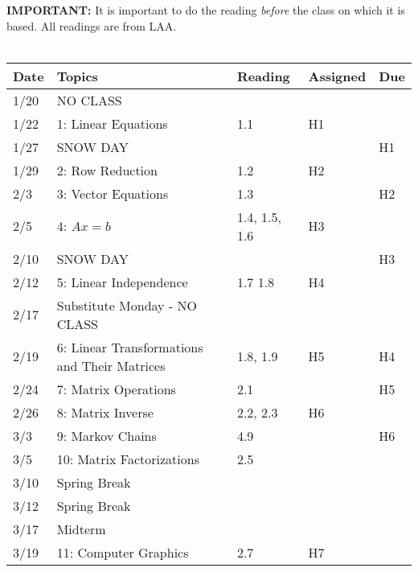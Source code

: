 \documentclass[11pt]{article}
\begin{document}
\textbf{IMPORTANT:} It is important to do the reading \emph{before} the class on
which it is based.   All readings are from LAA.
\\~\\
\small
\begin{centering}
\begin{tabular}{||l|p{3in}|l|l|l||}
\hline\hline
Date & Topics  & Reading & Assigned & Due  \\
\hline\hline
1/20 & NO CLASS &&& \\
1/22 & 1: Linear Equations & 1.1 & H1  & \\
\hline

1/27 & SNOW DAY &  & & H1 \\
1/29 & 2: Row Reduction & 1.2  & H2 & \\
\hline

2/3 & 3: Vector Equations & 1.3 & & H2 \\
2/5 & 4: $Ax = b$  & 1.4, 1.5, 1.6 & H3 & \\
\hline

2/10 & SNOW DAY & & & H3 \\
2/12 & 5: Linear Independence & 1.7 1.8 & H4 & \\ %
\hline

2/17 & Substitute Monday - NO CLASS & & &\\
2/19 & 6: Linear Transformations and Their Matrices  & 1.8, 1.9 & H5 & H4 \\
\hline

2/24 & 7: Matrix Operations  & 2.1 & & H5\\ 
2/26 & 8: Matrix Inverse & 2.2, 2.3 & H6 &\\ 
\hline

% 
3/3 & 9: Markov Chains & 4.9 & & H6 \\  
3/5 & 10: Matrix Factorizations & 2.5 & & \\ %
\hline

3/10 & Spring Break &&&\\
3/12 & Spring Break &&&\\
\hline

3/17 & Midterm & & &\\
3/19 & 11: Computer Graphics & 2.7 & H7 &\\ 
\hline


\end{tabular}
\end{centering}
\end{document}
